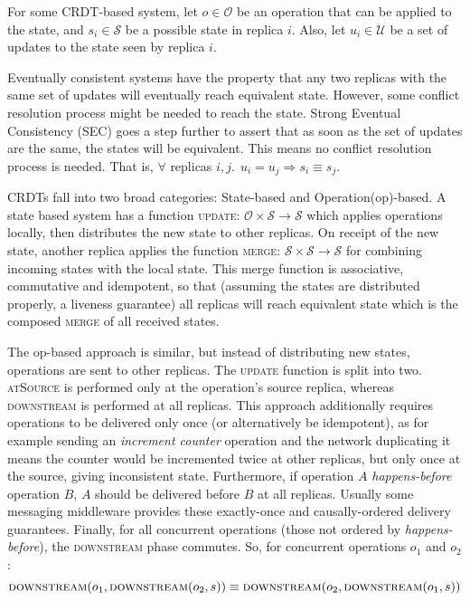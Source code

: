 \documentclass[diss.tex]{subfiles}
\begin{document}
For some CRDT-based system, let $o \in \mathcal{O}$ be an operation that can be applied to the state, and $s_i \in \mathcal{S}$ be a possible state in replica $i$. Also, let $u_i \in \mathcal{U}$ be a set of updates to the state seen by replica $i$. 

 Eventually consistent systems have the property that any two replicas with the same set of updates will eventually reach equivalent state. However, some conflict resolution process might be needed to reach the state.
 Strong Eventual Consistency (SEC) goes a step further to assert that as soon as the set of updates are the same, the states will be equivalent. This means no conflict resolution process is needed. That is, $\forall $ replicas $i,j.~~u_i = u_j \Rightarrow s_i \equiv s_j$.
 
 
CRDTs fall into two broad categories: State-based and Operation(op)-based. 
A state based system has a function \textsc{update}: $\mathcal{O} \times \mathcal{S} \rightarrow \mathcal{S}$
which applies operations locally, then distributes the new state to other replicas. On receipt of the new state, another replica applies the function \textsc{merge}: $\mathcal{S} \times \mathcal{S} \rightarrow \mathcal{S}$  for combining incoming states with the local state. This merge function is associative, commutative and idempotent, so that (assuming the states are distributed properly, a liveness guarantee) all replicas will reach equivalent state which is the composed \textsc{merge} of all received states.


The op-based approach is similar, but instead of distributing new states, operations are sent to other replicas. The \textsc{update} function is split into two. \textsc{atSource} is performed only at the operation's source replica, whereas \textsc{downstream} is performed at all replicas. 
This approach additionally requires operations to be delivered only once (or alternatively be idempotent), as for example sending an \textit{increment counter} operation and the network duplicating it means the counter would be incremented twice at other replicas, but only once at the source, giving inconsistent state. 
Furthermore, if operation $A$ \textit{happens-before} \cite{lamportshappensbefore} operation $B$, $A$ should be delivered before $B$ at all replicas. Usually some messaging middleware provides these exactly-once and causally-ordered delivery guarantees. Finally, for all concurrent operations (those not ordered by \textit{happens-before}), the \textsc{downstream} phase commutes. So, for concurrent operations $o_1$ and $o_2$: $$\textsc{downstream}(o_1, \textsc{downstream}(o_2, s)) \equiv \textsc{downstream}(o_2, \textsc{downstream}(o_1, s))$$
\end{document}

